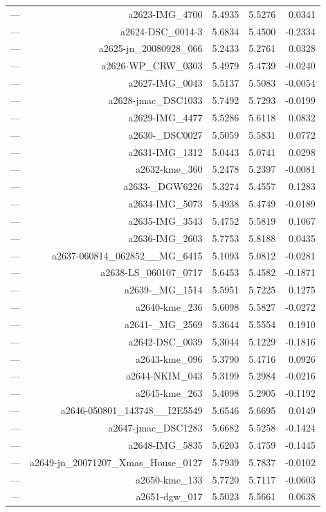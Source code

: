 \begin{table}[htbp]
\begin{tabular}{lrrrr}
— & a2623-IMG_4700 & 5.4935 & 5.5276 & 0.0341 \\
— & a2624-DSC_0014-3 & 5.6834 & 5.4500 & -0.2334 \\
— & a2625-jn_20080928_066 & 5.2433 & 5.2761 & 0.0328 \\
— & a2626-WP_CRW_0303 & 5.4979 & 5.4739 & -0.0240 \\
— & a2627-IMG_0043 & 5.5137 & 5.5083 & -0.0054 \\
— & a2628-jmac_DSC1033 & 5.7492 & 5.7293 & -0.0199 \\
— & a2629-IMG_4477 & 5.5286 & 5.6118 & 0.0832 \\
— & a2630-_DSC0027 & 5.5059 & 5.5831 & 0.0772 \\
— & a2631-IMG_1312 & 5.0443 & 5.0741 & 0.0298 \\
— & a2632-kme_360 & 5.2478 & 5.2397 & -0.0081 \\
— & a2633-_DGW6226 & 5.3274 & 5.4557 & 0.1283 \\
— & a2634-IMG_5073 & 5.4938 & 5.4749 & -0.0189 \\
— & a2635-IMG_3543 & 5.4752 & 5.5819 & 0.1067 \\
— & a2636-IMG_2603 & 5.7753 & 5.8188 & 0.0435 \\
— & a2637-060814_062852__MG_6415 & 5.1093 & 5.0812 & -0.0281 \\
— & a2638-LS_060107_0717 & 5.6453 & 5.4582 & -0.1871 \\
— & a2639-_MG_1514 & 5.5951 & 5.7225 & 0.1275 \\
— & a2640-kme_236 & 5.6098 & 5.5827 & -0.0272 \\
— & a2641-_MG_2569 & 5.3644 & 5.5554 & 0.1910 \\
— & a2642-DSC_0039 & 5.3044 & 5.1229 & -0.1816 \\
— & a2643-kme_096 & 5.3790 & 5.4716 & 0.0926 \\
— & a2644-NKIM_043 & 5.3199 & 5.2984 & -0.0216 \\
— & a2645-kme_263 & 5.4098 & 5.2905 & -0.1192 \\
— & a2646-050801_143748__I2E5549 & 5.6546 & 5.6695 & 0.0149 \\
— & a2647-jmac_DSC1283 & 5.6682 & 5.5258 & -0.1424 \\
— & a2648-IMG_5835 & 5.6203 & 5.4759 & -0.1445 \\
— & a2649-jn_20071207_Xmas_House_0127 & 5.7939 & 5.7837 & -0.0102 \\
— & a2650-kme_133 & 5.7720 & 5.7117 & -0.0603 \\
— & a2651-dgw_017 & 5.5023 & 5.5661 & 0.0638 \\

\end{tabular}
\end{table}

